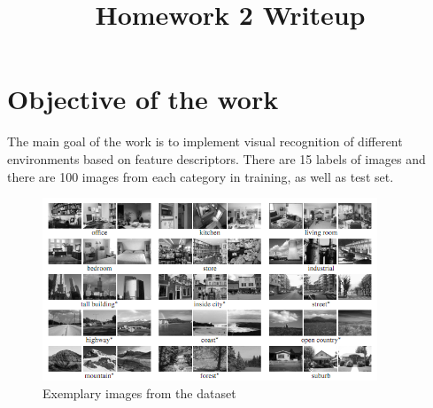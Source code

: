 \usepackage{subcaption} %

\renewcommand{\vec}[1]{\mathbf{#1}}

\usepackage[backend=biber]{biblatex} %

\usepackage[numbered,framed]{matlab-prettifier}

\frenchspacing
\setlength{\parindent}{0cm} %
\setlength{\parskip}{0.3cm plus1mm minus1mm}

\pagestyle{fancy}
\fancyhf{}
\rfoot{\thepage}

\date{}

\title{\vspace{-1cm}Homework 2 Writeup}



\maketitle
\vspace{-3cm}
\thispagestyle{fancy}

%

\section*{Objective of the work}

The main goal of the work is to implement visual recognition of different environments based on feature descriptors. There are 15 labels of images and there are 100 images from each category in training, as well as test set.

\begin{figure}[H]
    \centering
    \includegraphics[width=10cm]{categories.jpg}
    \caption{Exemplary images from the dataset \cite{lazebnik2006beyond}}
    \label{fig:dataset}
\end{figure}

